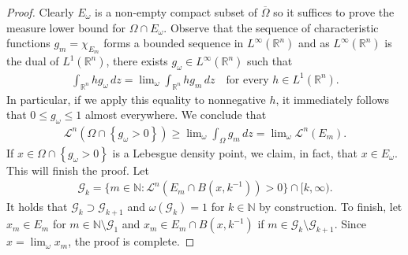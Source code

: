 \documentclass[a4paper,leqno]{amsart}
\numberwithin{equation}{section}
\theoremstyle{remark}
\theoremstyle{remark}
\newcommand{\N}{\mathbb{N}}
\newcommand{\lm}{\mathscr{L}}
\begin{document}
\begin{proof}
Clearly $E_\omega$ is a non-empty compact subset of $\overline{\Omega}$ so it suffices to prove the measure lower bound for $\Omega \cap E_\omega$.
%
%
Observe that the sequence of characteristic functions $g_m = \chi_{ E_m }$ forms a bounded sequence in $L^{\infty}( \mathbb{R}^n )$ and as $L^{\infty}( \mathbb{R}^n )$ is the dual of $L^{1}( \mathbb{R}^n )$, there exists $g_\omega \in L^{\infty}( \mathbb{R}^n )$ such that
\begin{align*}
    \int_{ \mathbb{R}^n } h g_\omega \,dz = \lim\nolimits_{\omega} \int_{ \mathbb{R}^n } h g_m \,dz
    \quad\text{for every $h \in L^{1}( \mathbb{R}^n )$.}
\end{align*}
In particular, if we apply this equality to nonnegative $h$, it immediately follows that $0 \leq g_\omega \leq 1$ almost everywhere. We conclude that
\begin{align*}
    \lm^n( \Omega \cap \left\{ g_\omega > 0 \right\} )
    \geq
    \lim\nolimits_{\omega} \int_{ \Omega } g_m \,dz
    =
    \lim\nolimits_{\omega} \lm^n( E_m ).
\end{align*}
If $x \in \Omega \cap \left\{ g_\omega > 0 \right\}$ is a Lebesgue density point, we claim, in fact, that $x \in E_\omega$. This will finish the proof. Let
\begin{align*}
    \mathcal{G}_k = \{ m \in \N \colon \lm^{n}( E_m \cap B( x, k^{-1} ) ) > 0 \} \cap [k,\infty).
\end{align*}
It holds that $\mathcal{G}_{k} \supset \mathcal{G}_{k+1}$ and $\omega( \mathcal{G}_k ) = 1$ for $k \in \N$ by construction. To finish, let $x_m \in E_m$ for $m \in \N \setminus \mathcal{G}_1$ and $x_m \in E_m \cap B( x, k^{-1} )$ if $m \in \mathcal{G}_{k} \setminus \mathcal{G}_{k+1}$. Since $x = \lim\nolimits_{\omega} x_m$, the proof is complete.
\end{proof}
\end{document}

